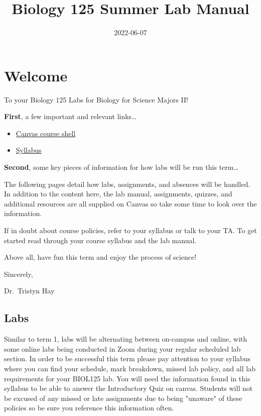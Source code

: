 \documentclass[
]{book}
\title{Biology 125 Summer Lab Manual}
\author{}
\date{\vspace{-2.5em}2022-06-07}
\providecommand{\tightlist}{%
  \setlength{\itemsep}{0pt}\setlength{\parskip}{0pt}}
\begin{document}
\maketitle

{
\setcounter{tocdepth}{1}
\tableofcontents
}
\hypertarget{welcome}{%
\chapter*{Welcome}\label{welcome}}

To your Biology 125 Labs for Biology for Science Majors II!

\textbf{First}, a few important and relevant links\ldots{}

\begin{itemize}
\tightlist
\item
  \href{https://canvas.ubc.ca/courses/90148}{Canvas course shell}
\item
  \href{https://canvas.ubc.ca/courses/90148/assignments/syllabus}{Syllabus}
\end{itemize}

\textbf{Second}, some key pieces of information for how labs will be run this term\ldots{}

The following pages detail how labs, assignments, and absences will be handled. In addition to the content here, the lab manual, assignments, quizzes, and additional resources are all supplied on Canvas so take some time to look over the information.

If in doubt about course policies, refer to your syllabus or talk to your TA. To get started read through your course syllabus and the lab manual.

Above all, have fun this term and enjoy the process of science!

Sincerely,

Dr.~Tristyn Hay

\hypertarget{labs}{%
\section*{Labs}\label{labs}}

Similar to term 1, labs will be alternating between on-campus and online, with some online labs being conducted in Zoom during your regular scheduled lab section. In order to be successful this term please pay attention to your syllabus where you can find your schedule, mark breakdown, missed lab policy, and all lab requirements for your BIOL125 lab. You will need the information found in this syllabus to be able to answer the Introductory Quiz on canvas. Students will not be excused of any missed or late assignments due to being "unaware" of these policies so be sure you reference this information often.
\end{document}
